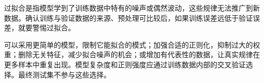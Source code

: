 过拟合是指模型学到了训练数据中特有的噪声或偶然波动，这些规律无法推广到新数据。确认训练与验证数据的来源、预处理可比较后，如果训练误差远低于验证误差，就要警惕过拟合。


可以采用更简单的模型，限制它能拟合的模式；加强合适的正则化，抑制过大的权重；删除无关特征，减少拟合噪声的机会；或增加有代表性的数据，让真实规律在更多样本中重复出现。模型复杂度和正则强度应通过训练数据内部的交叉验证选择。最终测试集不参与这些选择。
